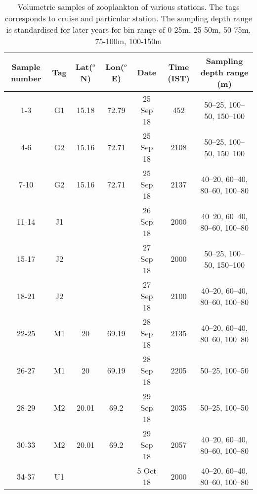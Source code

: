 \begin{table}[htbp]
	
	{\tiny 
		\captionsetup{justification=justified,font=footnotesize,skip=0.05\baselineskip,width=0.8\textwidth} %
		\caption{\newline Volumetric samples of zooplankton of various stations. The tags corresponds to cruise and particular station. The sampling depth range is standardised for later years for bin range of 0-25m, 25-50m, 50-75m, 75-100m, 100-150m}
		\begin{adjustwidth}{0.5in}{0in} 
			\begin{tabular}{ccccccc}
				\toprule
				Sample number & Tag & Lat($^o$N)    & Lon($^o$E)   & Date & Time (IST) & Sampling depth range (m)      \\
				\midrule
				1-3         & G1  & 15.18      & 72.79      & 25 Sep 18                 & 452        & 50–25, 100–50, 150–100        \\
				4-6         & G2  & 15.16      & 72.71      & 25 Sep 18                 & 2108       & 50–25, 100–50, 150–100        \\
				7-10        & G2  & 15.16      & 72.71      & 25 Sep 18                 & 2137       & 40–20, 60–40, 80–60, 100–80   \\
				11-14       & J1  &            &            & 26 Sep 18                 & 2000       & 40–20, 60–40, 80–60, 100–80   \\
				15-17       & J2  &            &            & 27 Sep 18                 & 2000       & 50–25, 100–50, 150–100        \\
				18-21       & J2  &            &            & 27 Sep 18                 & 2100       & 40–20, 60–40, 80–60, 100–80   \\
				22-25       & M1  & 20         & 69.19      & 28 Sep 18                 & 2135       & 40–20, 60–40, 80–60, 100–80   \\
				26-27       & M1  & 20         & 69.19      & 28 Sep 18                 & 2205       & 50–25, 100–50                 \\
				28-29       & M2  & 20.01      & 69.2       & 29 Sep 18                 & 2035       & 50–25, 100–50                 \\
				30-33       & M2  & 20.01      & 69.2       & 29 Sep 18                 & 2057       & 40–20, 60–40, 80–60, 100–80   \\
				34-37       & U1  &            &            & 5 Oct 18                  & 2000       & 40–20, 60–40, 80–60, 100–80   \\

\end{tabular}
\end{adjustwidth}}
\end{table}
